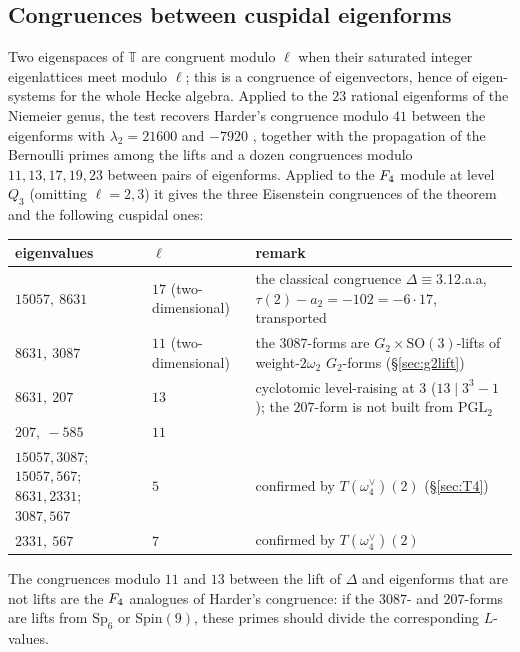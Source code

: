 \documentclass[11pt]{amsart}
\theoremstyle{definition}
\newcommand{\T}{\mathbb{T}}\newcommand{\Tr}{\operatorname{Tr}}\newcommand{\Aut}{\operatorname{Aut}}\newcommand{\Stab}{\operatorname{Stab}}
\begin{document}
\subsection{Congruences between cuspidal eigenforms} Two eigenspaces of $\T$ are congruent modulo $\ell$ when their saturated integer eigenlattices meet modulo $\ell$; this is a congruence of eigenvectors, hence of eigen-systems for the whole Hecke algebra. Applied to the $23$ rational eigenforms of the Niemeier genus, the test recovers Harder's congruence modulo $41$ between the eigenforms with $\lambda_2=21600$ and $-7920$ \cite{CL}, together with the propagation of the Bernoulli primes among the lifts and a dozen congruences modulo $11,13,17,19,23$ between pairs of eigenforms. Applied to the $F_4$ module at level $Q_3$ (omitting $\ell=2,3$) it gives the three Eisenstein congruences of the theorem and the following cuspidal ones:
\begin{center}\small
\begin{tabular}{@{}p{4.2cm}lp{7.4cm}@{}}\toprule
eigenvalues & $\ell$ & remark\\\midrule
$15057,\ 8631$ & $17$ (two-dimensional) & the classical congruence $\Delta\equiv$\textsf{3.12.a.a}, $\tau(2)-a_2=-102=-6\cdot17$, transported\\
$8631,\ 3087$ & $11$ (two-dimensional) & the $3087$-forms are $G_2\times\mathrm{SO}(3)$-lifts of weight-$2\omega_2$ $G_2$-forms (\S\ref{sec:g2lift})\\
$8631,\ 207$ & $13$ & cyclotomic level-raising at $3$ ($13\mid3^3-1$); the $207$-form is not built from $\mathrm{PGL}_2$\\
$207,\ -585$ & $11$ & \\
$15057,3087$; $15057,567$; $8631,2331$; $3087,567$ & $5$ & confirmed by $T(\omega_4^\vee)(2)$ (\S\ref{sec:T4})\\
$2331,\ 567$ & $7$ & confirmed by $T(\omega_4^\vee)(2)$\\\bottomrule
\end{tabular}
\end{center}
The congruences modulo $11$ and $13$ between the lift of $\Delta$ and eigenforms that are not lifts are the $F_4$ analogues of Harder's congruence: if the $3087$- and $207$-forms are lifts from $\mathrm{Sp}_6$ or $\mathrm{Spin}(9)$, these primes should divide the corresponding $L$-values.
\end{document}
